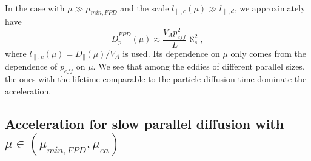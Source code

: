 \documentclass[preprint2,twocolumn,times,tighten]{aastex63}
\begin{document}
{\begin{equation}
\begin{aligned}
    \label{Dbarf}
\end{aligned}
\end{equation}
In the case with $\mu\gg \mu_{min,FPD}$ and the scale $l_{\|,c}(\mu)\gg l_{\|, d}$, we approximately have
\begin{equation}
    \bar{D}_p^{FPD} (\mu)\approx \frac{V_A p_{eff}^2}{ L} \aleph_s^2, 
    \label{Dbarf}
\end{equation}
where $l_{\|,c}(\mu) = D_\|(\mu)/V_A$ is used. 
{Its dependence on $\mu$ only comes from the dependence of $p_{eff}$ on $\mu$.}
We see that among the eddies of different parallel sizes, the ones with
the lifetime comparable to the particle diffusion time dominate the acceleration.







\subsection{Acceleration for slow parallel diffusion with $\mu \in (\mu_{min,FPD}, \mu_{ca})$}

}
\end{document}
